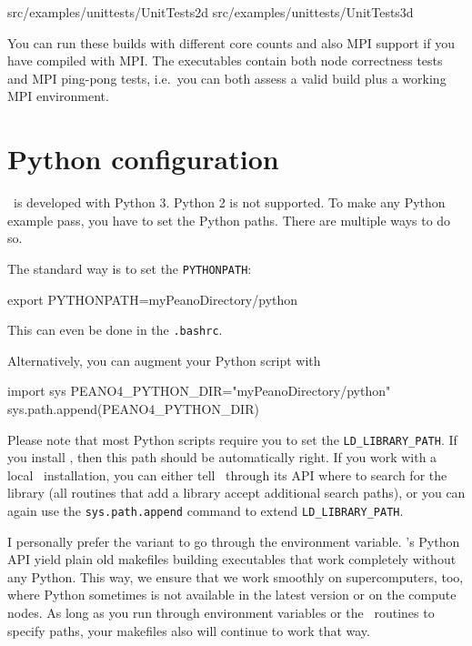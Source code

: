 \begin{code}
  src/examples/unittests/UnitTests2d
  src/examples/unittests/UnitTests3d
\end{code}

\noindent
You can run these builds with different core counts and also MPI support if you
have compiled with MPI.
The executables contain both node correctness tests and MPI ping-pong tests,
i.e.~you can both assess a valid build plus a working MPI environment.



\section{Python configuration}

\Peano\ is developed with Python 3. Python 2 is not supported. 
To make any Python example pass, you have to set the Python paths.
There are multiple ways to do so.

The standard way is to set the \texttt{PYTHONPATH}:
\begin{code}
export PYTHONPATH=myPeanoDirectory/python
\end{code}
This can even be done in the \texttt{.bashrc}.

Alternatively, you can augment your Python script with 
\begin{code}
import sys
PEANO4_PYTHON_DIR="myPeanoDirectory/python"
sys.path.append(PEANO4_PYTHON_DIR)
\end{code}


\noindent
Please note that most Python scripts require you to set the
\texttt{LD\_LIBRARY\_PATH}. 
If you install \Peano, then this path should be automatically right.
If you work with a local \Peano\ installation, you can either tell \Peano\
through its API where to search for the library (all routines that add a
library accept additional search paths), or you can again use the
\texttt{sys.path.append} command to extend \texttt{LD\_LIBRARY\_PATH}.


\begin{remark}
 I personally prefer the variant to go through the environment variable.
 \Peano's Python API yield plain old makefiles building executables that work
 completely without any Python. 
 This way, we ensure that we work smoothly on supercomputers, too, where Python
 sometimes is not available in the latest version or on the compute nodes.
 As long as you run through environment variables or the \Peano\ routines to
 specify paths, your makefiles also will continue to work that way. 
\end{remark}



